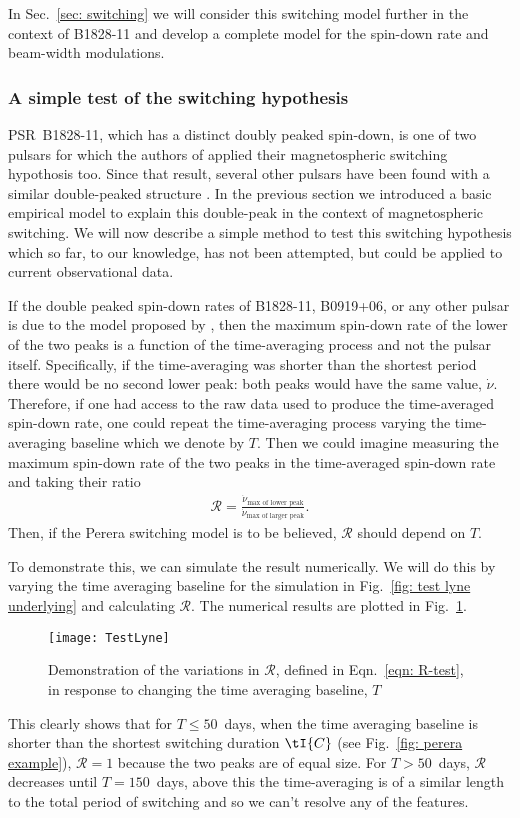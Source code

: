 In Sec.~\ref{sec: switching} we will consider this switching
model further in the context of B1828-11 and develop a complete model for the
spin-down rate and beam-width modulations.

\subsubsection{A simple test of the switching hypothesis}
\label{sec: switching predictions}
PSR~B1828-11, which has a distinct doubly peaked spin-down, is one of two
pulsars for which the authors of \citet{Lyne2010} applied their magnetospheric
switching hypothosis too. Since
that result, several other pulsars have been found with a similar double-peaked
structure \citep{Perera2014, Perera2016}. In the previous section we introduced
a basic empirical model to explain this double-peak in the context of
magnetospheric switching. We will now describe a simple method to test this
switching hypothesis which so far, to our knowledge, has not been attempted,
but could be applied to current observational data.

If the double peaked spin-down rates of B1828-11, B0919+06, or any other pulsar
is due to the model proposed by \citet{Perera2014}, then the maximum spin-down rate
of the lower of the two peaks is a function of the time-averaging process and not
the pulsar itself.  Specifically, if the time-averaging was shorter than the
shortest period there would be no second lower peak: both peaks would have the same
value, $\dot{\nu}$.  Therefore, if one had access to the raw data used to
produce the time-averaged spin-down rate, one could repeat the time-averaging
process varying the time-averaging baseline which we denote by $T$. Then we
could imagine measuring the maximum spin-down rate of the two peaks in the
time-averaged spin-down rate and taking their ratio
\begin{align}
\mathcal{R} = \frac{\dot{\nu}_\textrm{max of lower peak}}
                   {\dot{\nu}_\textrm{max of larger peak}}.
\label{eqn: R-test}
\end{align}
Then, if the Perera switching model is to be believed, $\mathcal{R}$ should depend on $T$.

To demonstrate this, we can simulate the result numerically. We will do this by
varying the time averaging baseline for the simulation in Fig.~\ref{fig: test
lyne underlying} and calculating $\mathcal{R}$. The numerical results are
plotted in Fig.~\ref{fig: test lyne}.
\begin{figure}[htb]
    \centering
    \texttt{[image: TestLyne]}
    \caption{Demonstration of the variations in $\mathcal{R}$, defined in
             Eqn.~\eqref{eqn: R-test}, in response to changing the time averaging
             baseline, $T$}
    \label{fig: test lyne}
\end{figure}
This clearly shows that for $T\le50$~days, when the time averaging baseline is
shorter than the shortest switching duration $\tI{C}$ (see Fig.~\ref{fig:
perera example}), $\mathcal{R}=1$ because the two peaks are of equal size.  For
$T>50$~days, $\mathcal{R}$ decreases until $T=150$~days, above this the
time-averaging is of a similar length to the total period of switching and so
we can't resolve any of the features.

